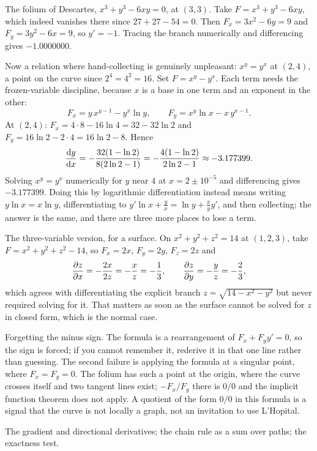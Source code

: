 \begin{worked}
The folium of Descartes, $x^{3}+y^{3}-6xy=0$, at $(3,3)$. Take $F=x^{3}+y^{3}-6xy$, which indeed vanishes there since $27+27-54=0$. Then $F_{x}=3x^{2}-6y=9$ and $F_{y}=3y^{2}-6x=9$, so $y'=-1$. Tracing the branch numerically and differencing gives $-1.0000000$.

Now a relation where hand-collecting is genuinely unpleasant: $x^{y}=y^{x}$ at $(2,4)$, a point on the curve since $2^{4}=4^{2}=16$. Set $F=x^{y}-y^{x}$. Each term needs the frozen-variable discipline, because $x$ is a base in one term and an exponent in the other:
\[
F_{x}=y\,x^{y-1}-y^{x}\ln y,\qquad F_{y}=x^{y}\ln x-x\,y^{x-1}.
\]
At $(2,4)$: $F_{x}=4\cdot 8-16\ln 4=32-32\ln 2$ and $F_{y}=16\ln 2-2\cdot 4=16\ln2-8$. Hence
\[
\frac{\mathrm{d}y}{\mathrm{d}x}=-\frac{32(1-\ln 2)}{8(2\ln 2-1)}=-\frac{4(1-\ln2)}{2\ln2-1}\approx-3.177399 .
\]
Solving $x^{y}=y^{x}$ numerically for $y$ near $4$ at $x=2\pm10^{-5}$ and differencing gives $-3.177399$. Doing this by logarithmic differentiation instead means writing $y\ln x=x\ln y$, differentiating to $y'\ln x+\tfrac{y}{x}=\ln y+\tfrac{x}{y}y'$, and then collecting; the answer is the same, and there are three more places to lose a term.

The three-variable version, for a surface. On $x^{2}+y^{2}+z^{2}=14$ at $(1,2,3)$, take $F=x^{2}+y^{2}+z^{2}-14$, so $F_{x}=2x$, $F_{y}=2y$, $F_{z}=2z$ and
\[
\frac{\partial z}{\partial x}=-\frac{2x}{2z}=-\frac{x}{z}=-\frac13,\qquad \frac{\partial z}{\partial y}=-\frac{y}{z}=-\frac23 ,
\]
which agrees with differentiating the explicit branch $z=\sqrt{14-x^{2}-y^{2}}$ but never required solving for it. That matters as soon as the surface cannot be solved for $z$ in closed form, which is the normal case.
\end{worked}

\begin{trap}
Forgetting the minus sign. The formula is a rearrangement of $F_{x}+F_{y}y'=0$, so the sign is forced; if you cannot remember it, rederive it in that one line rather than guessing. The second failure is applying the formula at a singular point, where $F_{x}=F_{y}=0$. The folium has such a point at the origin, where the curve crosses itself and two tangent lines exist; $-F_{x}/F_{y}$ there is $0/0$ and the implicit function theorem does not apply. A quotient of the form $0/0$ in this formula is a signal that the curve is not locally a graph, not an invitation to use L'Hopital.
\end{trap}

\begin{seealsob}The gradient and directional derivatives; the chain rule as a sum over paths; the exactness test.\end{seealsob}


